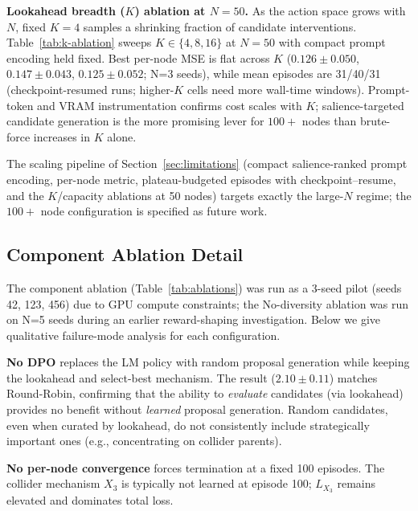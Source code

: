 \textbf{Lookahead breadth ($K$) ablation at $N{=}50$.} As the action space grows with $N$, fixed $K{=}4$ samples a shrinking fraction of candidate interventions. Table~\ref{tab:k-ablation} sweeps $K\in\{4,8,16\}$ at $N{=}50$ with compact prompt encoding held fixed. Best per-node MSE is flat across $K$ ($0.126\pm0.050$, $0.147\pm0.043$, $0.125\pm0.052$; N=3 seeds), while mean episodes are 31/40/31 (checkpoint-resumed runs; higher-$K$ cells need more wall-time windows). Prompt-token and VRAM instrumentation confirms cost scales with $K$; salience-targeted candidate generation is the more promising lever for $100+$ nodes than brute-force increases in $K$ alone.


The scaling pipeline of Section~\ref{sec:limitations} (compact salience-ranked prompt encoding, per-node metric, plateau-budgeted episodes with checkpoint--resume, and the $K$/capacity ablations at 50 nodes) targets exactly the large-$N$ regime; the $100+$ node configuration is specified as future work.

\subsection{Component Ablation Detail}
\label{app:ablation-detail}

The component ablation (Table~\ref{tab:ablations}) was run as a 3-seed pilot (seeds 42, 123, 456) due to GPU compute constraints; the No-diversity ablation was run on N=5 seeds during an earlier reward-shaping investigation. Below we give qualitative failure-mode analysis for each configuration.

\textbf{No DPO} replaces the LM policy with random proposal generation while keeping the lookahead and select-best mechanism. The result ($2.10\pm0.11$) matches Round-Robin, confirming that the ability to \emph{evaluate} candidates (via lookahead) provides no benefit without \emph{learned} proposal generation. Random candidates, even when curated by lookahead, do not consistently include strategically important ones (e.g., concentrating on collider parents).

\textbf{No per-node convergence} forces termination at a fixed 100 episodes. The collider mechanism $X_3$ is typically not learned at episode 100; $L_{X_3}$ remains elevated and dominates total loss.

